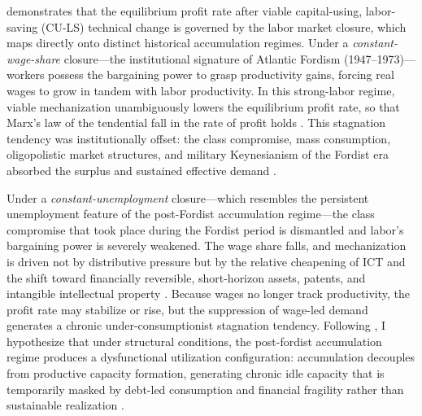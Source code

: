 \citet{Basu2026} demonstrates that the equilibrium profit
rate after viable capital-using, labor-saving (CU-LS)
technical change is governed by the labor market closure,
which maps directly onto distinct historical accumulation
regimes. Under a \textit{constant-wage-share} closure---the
institutional signature of Atlantic Fordism
(1947--1973)---workers possess the bargaining power to grasp
productivity gains, forcing real wages to grow in tandem with
labor productivity. In this strong-labor regime, viable
mechanization unambiguously lowers the equilibrium profit
rate, so that Marx's law of the tendential fall in the rate
of profit holds \citep{Basu2026}. This stagnation tendency
was institutionally offset: the class compromise, mass
consumption, oligopolistic market structures, and military
Keynesianism of the Fordist era absorbed the surplus and
sustained effective demand \citep{Vidal2019}.

Under a \textit{constant-unemployment} closure---which resembles the persistent unemployment feature of the post-Fordist accumulation regime---the class compromise that took place during the Fordist period is dismantled and labor's
bargaining power is severely weakened. The wage share falls,
and mechanization is driven not by distributive pressure but
by the relative cheapening of ICT and the shift toward
financially reversible, short-horizon assets, patents, and intangible intellectual property 
\citep{Lapavitsas2011, Pagano2014}. Because wages no longer
track productivity, the profit rate may stabilize or rise,
but the suppression of wage-led demand generates a chronic
under-consumptionist stagnation tendency. Following \citet{Vidal2019}, I hypothesize that under structural conditions, the post-fordist accumulation regime produces a dysfunctional utilization configuration:
accumulation decouples from productive capacity formation,
generating chronic idle capacity that is temporarily masked
by debt-led consumption and financial fragility rather than
sustainable realization \citep{Stockhammer2012, Vidal2019}.

